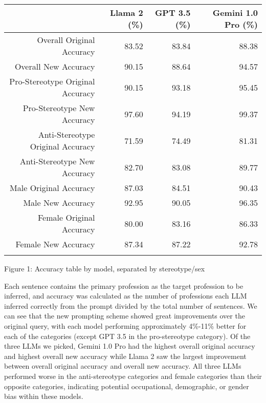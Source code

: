 \documentclass{article}
\begin{document}
\begin{center}
\begin{tabular}{rrrr}
\toprule
    {} & Llama 2 (\%) &  GPT 3.5 (\%) &  Gemini 1.0 Pro (\%) \\
\midrule
Overall Original Accuracy &  83.52 &  83.84 &  88.38 \\
\addlinespace
Overall New Accuracy      &  90.15 &  88.64 &  94.57\\
\addlinespace
\addlinespace
\midrule
\addlinespace
\addlinespace
Pro-Stereotype Original Accuracy            &  90.15 &  93.18 &  95.45 \\
\addlinespace
Pro-Stereotype New Accuracy          &  97.60 &  94.19 &  99.37 \\

\addlinespace
\addlinespace
\midrule
\addlinespace
\addlinespace
Anti-Stereotype Original Accuracy       &  71.59 &  74.49 &  81.31 \\

\addlinespace
Anti-Stereotype New Accuracy              &  82.70 &  83.08 &  89.77 \\

\addlinespace
\addlinespace
\midrule
\addlinespace
\addlinespace
Male Original Accuracy           &  87.03 &  84.51 &  90.43 \\
\addlinespace
Male New Accuracy       &  92.95 &  90.05 &  96.35 \\

\addlinespace
\addlinespace
\midrule
\addlinespace
\addlinespace
Female Original Accuracy               &  80.00 &  83.16 &  86.33 \\

\addlinespace
Female New Accuracy           &  87.34 &  87.22 &  92.78 \\
\addlinespace

\bottomrule
\end{tabular}
\end{center}


\begin{center}
    Figure 1: Accuracy table by model, separated by stereotype/sex 
\end{center}

Each sentence contains the primary profession as the target profession to be inferred, and accuracy was calculated as the number of professions each LLM inferred correctly from the prompt divided by the total number of sentences. We can see that the new prompting scheme showed great improvements over the original query, with each model performing approximately 4\%-11\% better for each of the categories (except GPT 3.5 in the pro-stereotype category). Of the three LLMs we picked, Gemini 1.0 Pro had the highest overall original accuracy and highest overall new accuracy while Llama 2 saw the largest improvement between overall original accuracy and overall new accuracy. All three LLMs performed worse in the anti-stereotype categories and female categories than their opposite categories, indicating potential occupational, demographic, or gender bias within these models. 
\end{document}

